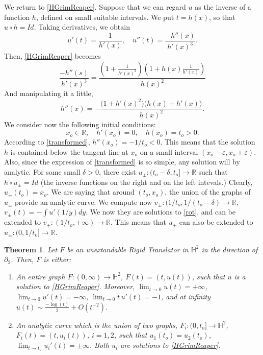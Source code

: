 \documentclass[12pt]{article}
\newtheorem{theorem}[lemma]{Theorem}
\numberwithin{lemma}{section}
\newcommand{\R}{\mathbb{R}}
\renewcommand{\H}[1]{\mathbb{H}^{#1}}
\newcommand{\ep}{\varepsilon}
\begin{document}
{We return to \eqref{HGrimReaper}. Suppose that we can regard $u$ as the inverse of a function $h$, defined on small suitable intervals. We put $t=h(x)$, so that $u\circ h=Id$. Taking derivatives, we obtain
\[ u'(t) = \frac{1}{h'(x)}, \quad u''(t) = \frac{-h''(x)}{h'(x)^3}.
\]
Then, \eqref{HGrimReaper} becomes
\[ \frac{-h''(s)}{h'(x)^3} = \frac{
\left(1+\frac{1}{h'(x)^2} \right)  \left( 1+h(x)\frac{1}{h'(x)}\right) }{h(x)^2}
\]
And manipulating it a little, 
\begin{equation}
\label{transformed} h''(x) = -\frac{\big(1+h'(x)^2\big)\big(h(x)+h'(x)\big)}{h(x)^2}.
\end{equation}
We consider now the following initial conditions: 
\[  x_o\in \R, \quad h'(x_o)=0, \quad h(x_o)=t_o>0.
\]
According to \eqref{transformed}, $h''(x_o)=-1/t_o<0$. This means that the solution $h$  is contained below the tangent line at $x_o$ on a small interval $(x_o-\ep,x_o+\ep)$. Also, since the expression of \eqref{transformed} is so simple, any solution will by analytic. For some small $\delta>0$, there exist $u_{\pm}:(t_o-\delta,t_o]\rightarrow\R$ such that $h\circ u_{\pm}=Id$ (the inverse functions on the right and on the left intevals.) Clearly, $u_{\pm}(t_o)=x_o$. We are saying that around $(t_o,x_o)$, the union of the graphs of $u_{\pm}$ provide an analytic curve. We compute now $v_{\pm}:(1/t_o,1/(t_o-\delta)\rightarrow\R$, $v_{\pm}(t)=-\int u'(1/y)dy$. We now they are solutions to \eqref{rot}, and can be extended to 
$v_{\pm}:(1/t_o,+\infty)\rightarrow\R$. This means that $u_{\pm}$ can also be extended to $u_{\pm}:(0,1/t_o]\rightarrow\R$. 
\begin{theorem} Let $F$ be an unextandable Rigid Translator in $\H{2}$ in the direction of $\partial_{2}$. Then, $F$  is either:
\begin{enumerate}
\item An entire graph $F:(0,\infty)\rightarrow\mathbb{H}^2$, $F(t)=(t,u(t))$, such that $u$ is a solution to \eqref{HGrimReaper}. Moreover, $\lim_{t\to 0}u(t)=+\infty$, $\lim_{t\to 0} u'(t)=-\infty$, $\lim_{t\to 0} t\,u'(t) = -1$, and at infinity $u(t) \sim \frac{-\log(t)}{2} + O(t^{-2})$.
\item An analytic curve which is the union of two graphs, $F_i:(0,t_o]\rightarrow\mathbb{H}^2$, $F_i(t)=(t,u_i(t))$, $i=1,2$, such that $u_1(t_o)=u_2(t_o)$, $\lim_{t\to t_o}u_i'(t)=\pm \infty$. Both $u_i$ are solutions to \eqref{HGrimReaper}. 
\end{enumerate}
\end{theorem}


}
\end{document}
